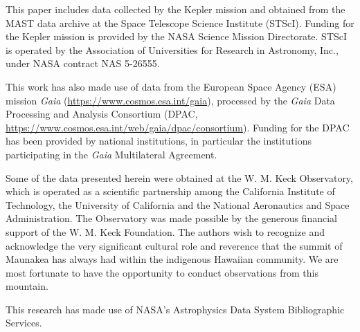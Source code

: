 \documentclass[twocolumn]{aastex63}
\begin{document}
\begin{acknowledgments}

This paper includes data collected by the Kepler mission and obtained from the MAST data archive at the Space Telescope Science Institute (STScI). Funding for the Kepler mission is provided by the NASA Science Mission Directorate. STScI is operated by the Association of Universities for Research in Astronomy, Inc., under NASA contract NAS 5-26555.

This work has also made use of data from the European Space Agency (ESA) mission {\it Gaia} (\url{https://www.cosmos.esa.int/gaia}), processed by the {\it Gaia} Data Processing and Analysis Consortium (DPAC, \url{https://www.cosmos.esa.int/web/gaia/dpac/consortium}). Funding for the DPAC has been provided by national institutions, in particular the institutions participating in the {\it Gaia} Multilateral Agreement.

Some of the data presented herein were obtained at the W. M. Keck Observatory, which is operated as a scientific partnership among the California Institute of Technology, the University of California and the National Aeronautics and Space Administration. The Observatory was made possible by the generous financial support of the W. M. Keck Foundation. The authors wish to recognize and acknowledge the very significant cultural role and reverence that the summit of Maunakea has always had within the indigenous Hawaiian community.  We are most fortunate to have the opportunity to conduct observations from this mountain. 

This research has made use of NASA's Astrophysics Data System Bibliographic Services.


\end{acknowledgments}








\end{document}
